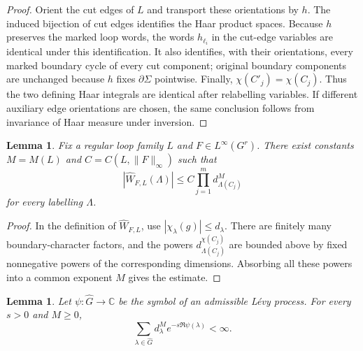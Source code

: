\documentclass[11pt,a4paper,reqno]{article}
\newtheorem{lemma}[theorem]{Lemma}
\theoremstyle{definition}
\theoremstyle{remark}
\newcommand\C{\mathbb{C}}
\begin{document}
\begin{proof}
Orient the cut edges of $L$ and transport these orientations by $h$. The induced bijection of cut edges identifies the Haar product spaces. Because $h$ preserves the marked loop words, the words $h_{\ell_i}$ in the cut-edge variables are identical under this identification. It also identifies, with their orientations, every marked boundary cycle of every cut component; original boundary components are unchanged because $h$ fixes $\partial\Sigma$ pointwise. Finally, $\chi(C'_j)=\chi(C_j)$. Thus the two defining Haar integrals are identical after relabelling variables. If different auxiliary edge orientations are chosen, the same conclusion follows from invariance of Haar measure under inversion.
\end{proof}

\begin{lemma}\label{lem:topological-coefficient-polynomial-bound}
Fix a regular loop family $L$ and $F\in L^\infty(G^r)$. There exist constants $M=M(L)$ and $C=C(L,\|F\|_\infty)$ such that
\[
 |\widehat W_{F,L}(\Lambda)|
 \le
 C\prod_{j=1}^m d_{\Lambda(C_j)}^M
\]
for every labelling $\Lambda$.
\end{lemma}

\begin{proof}
In the definition of $\widehat W_{F,L}$, use $|\chi_\lambda(g)|\le d_\lambda$. There are finitely many boundary-character factors, and the powers $d_{\Lambda(C_j)}^{\chi(C_j)}$ are bounded above by fixed nonnegative powers of the corresponding dimensions. Absorbing all these powers into a common exponent $M$ gives the estimate.
\end{proof}

\begin{lemma}\label{lem:levy-symbol-summability}
Let $\psi:\widehat G\to\C$ be the symbol of an admissible L\'evy process. For every $s>0$ and $M\ge0$,
\begin{equation}\label{eq:bound-symbol-exp}
 \sum_{\lambda\in\widehat G}
 d_\lambda^M e^{-s\Re\psi(\lambda)}<\infty.
\end{equation}
\end{lemma}
\end{document}
